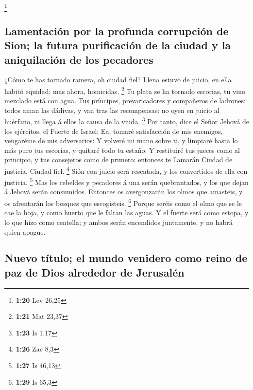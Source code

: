 \footnote{\textbf{1:20} Lev 26,25}

\hypertarget{lamentaciuxf3n-por-la-profunda-corrupciuxf3n-de-sion-la-futura-purificaciuxf3n-de-la-ciudad-y-la-aniquilaciuxf3n-de-los-pecadores}{%
\subsection{Lamentación por la profunda corrupción de Sion; la futura
purificación de la ciudad y la aniquilación de los
pecadores}\label{lamentaciuxf3n-por-la-profunda-corrupciuxf3n-de-sion-la-futura-purificaciuxf3n-de-la-ciudad-y-la-aniquilaciuxf3n-de-los-pecadores}}

 ¿Cómo te has tornado ramera, oh ciudad fiel? Llena
estuvo de juicio, en ella habitó equidad; mas ahora, homicidas.
\footnote{\textbf{1:21} Mat 23,37}  Tu plata se ha
tornado escorias, tu vino mezclado está con agua.  Tus
príncipes, prevaricadores y compañeros de ladrones: todos aman las
dádivas, y van tras las recompensas: no oyen en juicio al huérfano, ni
llega á ellos la causa de la viuda. \footnote{\textbf{1:23} Is 1,17}
 Por tanto, dice el Señor Jehová de los ejércitos, el
Fuerte de Israel: Ea, tomaré satisfacción de mis enemigos, vengaréme de
mis adversarios:  Y volveré mi mano sobre ti, y limpiaré
hasta lo más puro tus escorias, y quitaré todo tu estaño:
 Y restituiré tus jueces como al principio, y tus
consejeros como de primero: entonces te llamarán Ciudad de justicia,
Ciudad fiel. \footnote{\textbf{1:26} Zac 8,3}  Sión con
juicio será rescatada, y los convertidos de ella con justicia.
\footnote{\textbf{1:27} Is 46,13}  Mas los rebeldes y
pecadores á una serán quebrantados, y los que dejan á Jehová serán
consumidos.  Entonces os avergonzarán los olmos que
amasteis, y os afrentarán los bosques que escogisteis. \footnote{\textbf{1:29}
  Is 65,3}  Porque seréis como el olmo que se le cae la
hoja, y como huerto que le faltan las aguas.  Y el fuerte
será como estopa, y lo que hizo como centella; y ambos serán encendidos
juntamente, y no habrá quien apague.

\hypertarget{nuevo-tuxedtulo-el-mundo-venidero-como-reino-de-paz-de-dios-alrededor-de-jerusaluxe9n}{%
\subsection{Nuevo título; el mundo venidero como reino de paz de Dios
alrededor de
Jerusalén}\label{nuevo-tuxedtulo-el-mundo-venidero-como-reino-de-paz-de-dios-alrededor-de-jerusaluxe9n}}

